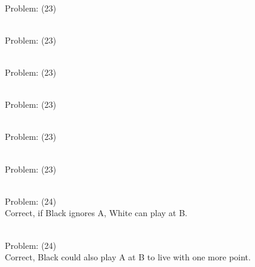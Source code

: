 \documentclass[11pt]{article}
\begin{document}
\begin{minipage}[t]{0.5\textwidth}
  {\centering
  
\\
Problem: (23)\\
  }
\end{minipage}
\begin{minipage}[t]{0.5\textwidth}
  {\centering
  
\\
Problem: (23)\\
  }
\end{minipage}
\begin{minipage}[t]{0.5\textwidth}
  {\centering
  
\\
Problem: (23)\\
  }
\end{minipage}
\begin{minipage}[t]{0.5\textwidth}
  {\centering
  
\\
Problem: (23)\\
  }
\end{minipage}
\begin{minipage}[t]{0.5\textwidth}
  {\centering
  
\\
Problem: (23)\\
  }
\end{minipage}
\begin{minipage}[t]{0.5\textwidth}
  {\centering
  
\\
Problem: (23)\\
  }
\end{minipage}
\begin{minipage}[t]{0.5\textwidth}
  {\centering
  
\\
Problem: (24)\\
Correct, if Black ignores A, White can play at B.\\
  }
\end{minipage}
\begin{minipage}[t]{0.5\textwidth}
  {\centering
  
\\
Problem: (24)\\
Correct, Black could also play A at B to live with one more point.\\
  }
\end{minipage}
\end{document}
